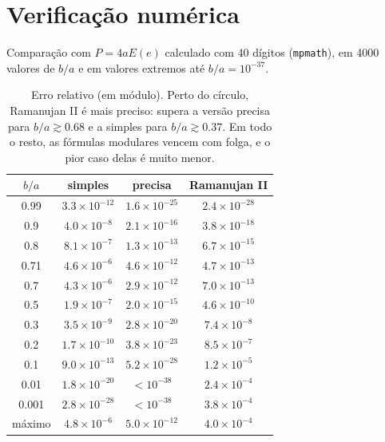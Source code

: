 \documentclass[11pt,a4paper]{article}
\theoremstyle{remark}
\begin{document}
\section{Verificação numérica}\label{sec:num}

Comparação com $P=4aE(e)$ calculado com 40 dígitos (\texttt{mpmath}), em 4000 valores
de $b/a$ e em valores extremos até $b/a=10^{-37}$.

\begin{table}[H]
\centering
\begin{tabular}{cccc}
\toprule
$b/a$ & simples & precisa & Ramanujan II\\
\midrule
0.99 & $3.3\times10^{-12}$ & $1.6\times10^{-25}$ & $2.4\times10^{-28}$\\
0.9  & $4.0\times10^{-8}$  & $2.1\times10^{-16}$ & $3.8\times10^{-18}$\\
0.8  & $8.1\times10^{-7}$  & $1.3\times10^{-13}$ & $6.7\times10^{-15}$\\
0.71 & $4.6\times10^{-6}$  & $4.6\times10^{-12}$ & $4.7\times10^{-13}$\\
0.7  & $4.3\times10^{-6}$  & $2.9\times10^{-12}$ & $7.0\times10^{-13}$\\
0.5  & $1.9\times10^{-7}$  & $2.0\times10^{-15}$ & $4.6\times10^{-10}$\\
0.3  & $3.5\times10^{-9}$  & $2.8\times10^{-20}$ & $7.4\times10^{-8}$\\
0.2  & $1.7\times10^{-10}$ & $3.8\times10^{-23}$ & $8.5\times10^{-7}$\\
0.1  & $9.0\times10^{-13}$ & $5.2\times10^{-28}$ & $1.2\times10^{-5}$\\
0.01 & $1.8\times10^{-20}$ & $<10^{-38}$ & $2.4\times10^{-4}$\\
0.001& $2.8\times10^{-28}$ & $<10^{-38}$ & $3.8\times10^{-4}$\\
\midrule
máximo & $4.8\times10^{-6}$ & $5.0\times10^{-12}$ & $4.0\times10^{-4}$\\
\bottomrule
\end{tabular}
\caption{Erro relativo (em módulo). Perto do círculo, Ramanujan II é mais preciso: supera a
versão precisa para $b/a\gtrsim0.68$ e a simples para $b/a\gtrsim0.37$. Em todo o resto, as fórmulas modulares vencem com folga, e o pior caso
delas é muito menor.}
\end{table}
\end{document}
